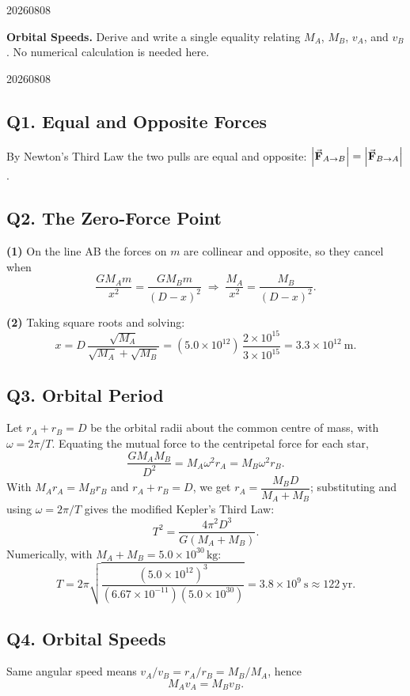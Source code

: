 \begin{problem}{20260808}
\begin{questions}
  \item \textbf{Orbital Speeds.}
        Derive and write a single equality relating $M_A$, $M_B$, $v_A$, and $v_B$.  No numerical calculation is needed here.
\end{questions}

\end{problem}

\begin{solution}{20260808}

\subsection*{Q1. Equal and Opposite Forces}

By Newton's Third Law the two pulls are equal and opposite: $\left\lvert \vec{\mathbf{F}}_{A\to B} \right\rvert = \left\lvert \vec{\mathbf{F}}_{B\to A} \right\rvert$.

\subsection*{Q2. The Zero-Force Point}

\textbf{(1)}  On the line AB the forces on $m$ are collinear and opposite, so they cancel when
\[
\frac{G M_A m}{x^{2}} = \frac{G M_B m}{(D-x)^{2}}
\;\Longrightarrow\;
\frac{M_A}{x^{2}} = \frac{M_B}{(D-x)^{2}}.
\]

\textbf{(2)}  Taking square roots and solving:
\[
x = D\,\frac{\sqrt{M_A}}{\sqrt{M_A}+\sqrt{M_B}}
  = (5.0\times10^{12})\,\frac{2\times10^{15}}{3\times10^{15}}
  = \boxed{3.3\times10^{12}\ \mathrm{m}}.
\]

\subsection*{Q3. Orbital Period}

Let $r_A + r_B = D$ be the orbital radii about the common centre of mass, with $\omega = 2\pi/T$.  Equating the mutual force to the centripetal force for each star,
\[
\frac{G M_A M_B}{D^{2}} = M_A\omega^{2} r_A = M_B\omega^{2} r_B.
\]
With $M_A r_A = M_B r_B$ and $r_A+r_B=D$, we get $r_A = \dfrac{M_B D}{M_A+M_B}$; substituting and using $\omega = 2\pi/T$ gives the modified Kepler's Third Law:
\[
\boxed{T^{2} = \frac{4\pi^{2}D^{3}}{G(M_A+M_B)}}.
\]
Numerically, with $M_A+M_B = 5.0\times10^{30}\,\mathrm{kg}$:
\[
T = 2\pi\sqrt{\frac{(5.0\times10^{12})^{3}}{(6.67\times10^{-11})(5.0\times10^{30})}}
  = \boxed{3.8\times10^{9}\ \mathrm{s}} \approx 122\ \text{yr}.
\]

\subsection*{Q4. Orbital Speeds}

Same angular speed means $v_A/v_B = r_A/r_B = M_B/M_A$, hence
\[
\boxed{M_A v_A = M_B v_B}.
\]

\end{solution}


